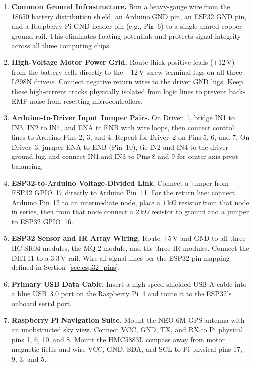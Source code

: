 \documentclass[conference]{IEEEtran}
\begin{document}
\begin{enumerate}
    \item \textbf{Common Ground Infrastructure.} Run a heavy-gauge wire from the 18650 battery distribution shield, an Arduino GND pin, an ESP32 GND pin, and a Raspberry Pi GND header pin (e.g., Pin~6) to a single shared copper ground rail. This eliminates floating potentials and protects signal integrity across all three computing chips.

    \item \textbf{High-Voltage Motor Power Grid.} Route thick positive leads ($+12\,\text{V}$) from the battery cells directly to the $+12\,\text{V}$ screw-terminal lugs on all three L298N drivers. Connect negative return wires to the driver GND lugs. Keep these high-current tracks physically isolated from logic lines to prevent back-EMF noise from resetting microcontrollers.

    \item \textbf{Arduino-to-Driver Input Jumper Pairs.} On Driver~1, bridge IN1 to IN3, IN2 to IN4, and ENA to ENB with wire loops, then connect control lines to Arduino Pins 2, 3, and 4. Repeat for Driver~2 on Pins 5, 6, and 7. On Driver~3, jumper ENA to ENB (Pin~10), tie IN2 and IN4 to the driver ground lug, and connect IN1 and IN3 to Pins 8 and 9 for center-axis pivot balancing.

    \item \textbf{ESP32-to-Arduino Voltage-Divided Link.} Connect a jumper from ESP32 GPIO~17 directly to Arduino Pin~11. For the return line: connect Arduino Pin~12 to an intermediate node, place a $1\,\text{k}\Omega$ resistor from that node in series, then from that node connect a $2\,\text{k}\Omega$ resistor to ground and a jumper to ESP32 GPIO~16.

    \item \textbf{ESP32 Sensor and IR Array Wiring.} Route $+5\,\text{V}$ and GND to all three HC-SR04 modules, the MQ-2 module, and the three IR modules. Connect the DHT11 to a $3.3\,\text{V}$ rail. Wire all signal lines per the ESP32 pin mapping defined in Section~\ref{sec:esp32_pins}.

    \item \textbf{Primary USB Data Cable.} Insert a high-speed shielded USB-A cable into a blue USB~3.0 port on the Raspberry Pi~4 and route it to the ESP32's onboard serial port.

    \item \textbf{Raspberry Pi Navigation Suite.} Mount the NEO-6M GPS antenna with an unobstructed sky view. Connect VCC, GND, TX, and RX to Pi physical pins 1, 6, 10, and 8. Mount the HMC5883L compass away from motor magnetic fields and wire VCC, GND, SDA, and SCL to Pi physical pins 17, 9, 3, and 5.
\end{enumerate}
\end{document}
